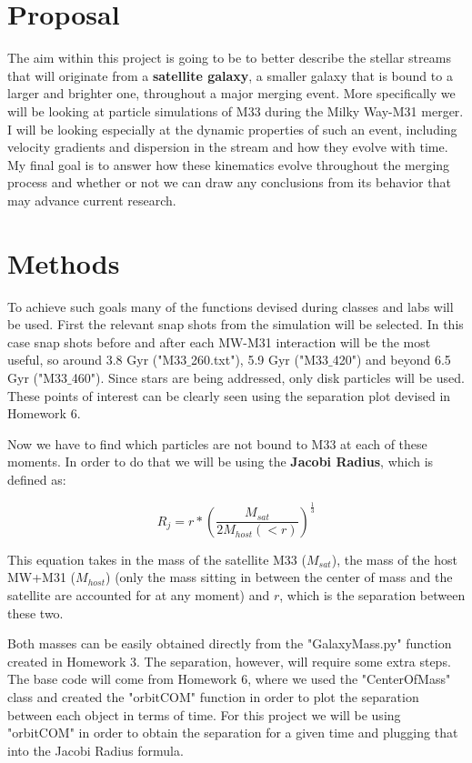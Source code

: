 \documentclass[linenumbers,trackchanges]{aastex7}
\begin{document}
\section{Proposal} \label{sec:proposal}

The aim within this project is going to be to better describe the stellar streams that will originate from a \textbf{satellite galaxy}, a smaller galaxy that is bound to a larger and brighter one, throughout a major merging event. More specifically we will be looking at particle simulations of M33 during the Milky Way-M31 merger. I will be looking especially at the dynamic properties of such an event, including velocity gradients and dispersion in the stream and how they evolve with time. My final goal is to answer how these kinematics evolve throughout the merging process and whether or not we can draw any conclusions from its behavior that may advance current research. 

\section{Methods} \label{sec:methods}

To achieve such goals many of the functions devised during classes and labs will be used. First the relevant snap shots from the simulation will be selected. In this case snap shots before and after each MW-M31 interaction will be the most useful, so around 3.8 Gyr ("M33$\_$260.txt"), 5.9 Gyr ({"M33$\_$420"}) and beyond 6.5 Gyr ("M33$\_$460"). Since stars are being addressed, only disk particles will be used. These points of interest can be clearly seen using the separation plot devised in Homework 6.


Now we have to find which particles are not bound to M33 at each of these moments. In order to do that we will be using the \textbf{Jacobi Radius}, which is defined as:

\begin{equation}
    R_j = r*{(\frac{M_{sat}}{2M_{host}(<r)})}^{\frac{1}{3}}
\end{equation}

This equation takes in the mass of the satellite M33 ($M_{sat}$), the mass of the host MW+M31 ($M_{host}$) (only the mass sitting in between the center of mass and the satellite are accounted for at any moment) and $r$, which is the separation between these two.

Both masses can be easily obtained directly from the "GalaxyMass.py" function created in Homework 3. The separation, however, will require some extra steps. The base code will come from Homework 6, where we used the "CenterOfMass" class and created the "orbitCOM" function in order to plot the separation between each object in terms of time. For this project we will be using "orbitCOM" in order to obtain the separation for a given time and plugging that into the Jacobi Radius formula.
\end{document}
